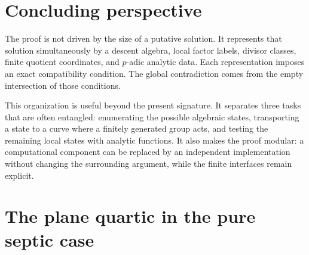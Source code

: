 \documentclass[11pt]{article}
\theoremstyle{definition}
\theoremstyle{remark}
\begin{document}
\section{Concluding perspective}

The proof is not driven by the size of a putative solution.  It represents
that solution simultaneously by a descent algebra, local factor labels,
divisor classes, finite quotient coordinates, and $p$-adic analytic data.
Each representation imposes an exact compatibility condition.  The global
contradiction comes from the empty intersection of those conditions.

This organization is useful beyond the present signature.  It separates
three tasks that are often entangled: enumerating the possible algebraic
states, transporting a state to a curve where a finitely generated group
acts, and testing the remaining local states with analytic functions.  It
also makes the proof modular: a computational component can be replaced by an
independent implementation without changing the surrounding argument, while
the finite interfaces remain explicit.

\appendix

\section{The plane quartic in the pure septic case}\label{app:Cplus}
\end{document}
